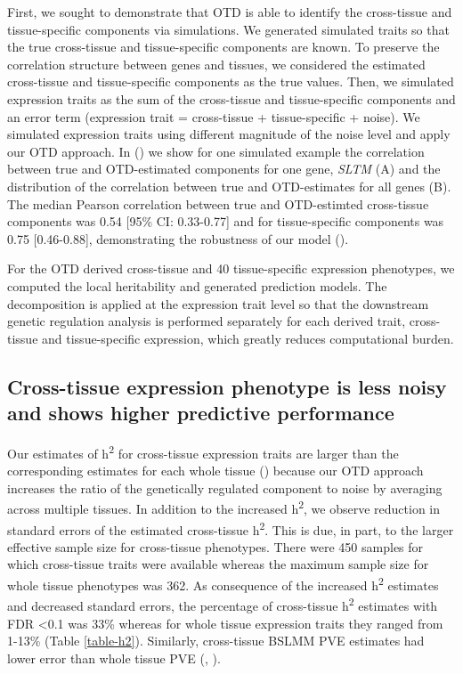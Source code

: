 \documentclass[10pt,letterpaper]{article}
\begin{document}
First, we sought to demonstrate that OTD is able to identify the cross-tissue and tissue-specific components via simulations. We generated simulated traits so that the true cross-tissue and tissue-specific components are known. To preserve the correlation structure between genes and tissues, we considered the estimated cross-tissue and tissue-specific components as the true values. Then, we simulated expression traits as the sum of the cross-tissue and tissue-specific components and an error term (expression trait = cross-tissue + tissue-specific + noise). We simulated expression traits using different magnitude of the noise level and apply our OTD approach. 
In () we show for one simulated example the correlation between true and OTD-estimated components for one gene, \textit{SLTM} (A) and the distribution of the correlation between true and OTD-estimates for all genes (B). The median Pearson correlation between true and OTD-estimted cross-tissue components was 0.54 [95\% CI: 0.33-0.77] and for tissue-specific components was 0.75 [0.46-0.88], demonstrating the robustness of our model (). 

For the OTD derived cross-tissue and 40 tissue-specific expression phenotypes, we computed the local heritability and generated prediction models.
The decomposition is applied at the expression trait level so that the downstream genetic regulation analysis is performed separately for each derived trait, cross-tissue and tissue-specific expression, which greatly reduces computational burden. 

\subsection*{Cross-tissue expression phenotype is less noisy and shows higher predictive performance}%

Our estimates of h\textsuperscript{2} for cross-tissue expression traits are larger than the corresponding estimates for each whole tissue () because our OTD approach increases the ratio of the genetically regulated component to noise by averaging across multiple tissues. In addition to the increased h\textsuperscript{2}, we observe reduction in standard errors of the estimated cross-tissue h\textsuperscript{2}. This is due, in part, to the larger effective sample size for cross-tissue phenotypes. There were 450 samples for which cross-tissue traits were available whereas the maximum sample size for whole tissue phenotypes was 362. As consequence of the increased h\textsuperscript{2} estimates and decreased standard errors, the percentage of cross-tissue h\textsuperscript{2} estimates with FDR \textless{0.1} was 33\% whereas for whole tissue expression traits they ranged from 1-13\% (Table \ref{table-h2}). Similarly, cross-tissue BSLMM PVE estimates had lower error than whole tissue PVE (, ). 
\end{document}
